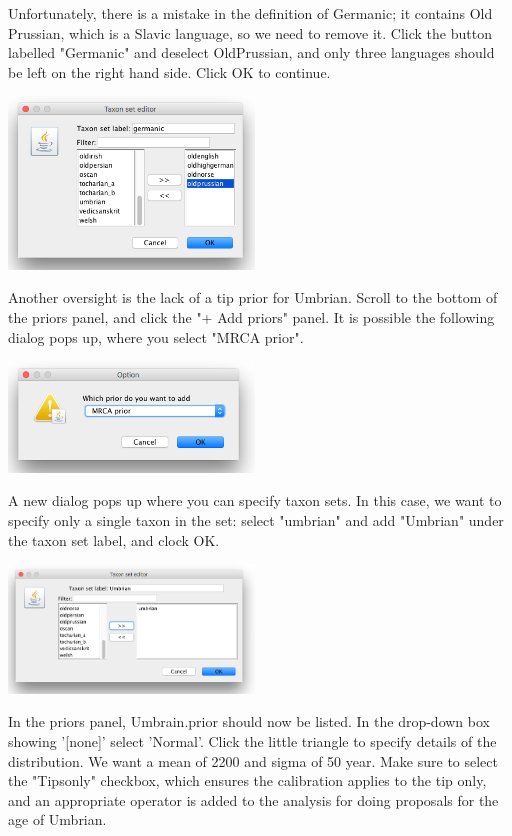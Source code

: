\documentclass{article}
\begin{document}
Unfortunately, there is a mistake in the definition of Germanic; it contains Old Prussian, which is a Slavic language, so we need to remove it. Click the button labelled "Germanic" and deselect  OldPrussian, and only three languages should be left on the right hand side. Click OK to continue.

\begin{center}
\includegraphics[width=0.49\textwidth]{germanic}
\end{center}

Another oversight is the lack of a tip prior for Umbrian. Scroll to the bottom of the priors panel, and click the "+ Add priors" panel. It is possible the following dialog pops up, where you select "MRCA prior".

\begin{center}
\includegraphics[width=0.49\textwidth]{MRCAPrior}
\end{center}
A new dialog pops up where you can specify taxon sets. In this case, we want to specify only a single taxon  in the set: select "umbrian" and add "Umbrian" under the taxon set label, and clock OK.
\begin{center}
\includegraphics[width=0.49\textwidth]{umbrian}
\end{center}

In the priors panel, Umbrain.prior should now be listed. In the drop-down box showing '[none]' select 'Normal'.
Click the little triangle to specify details of the distribution. We want a mean of 2200 and sigma of 50 year.
Make sure to select the "Tipsonly" checkbox, which ensures the calibration applies to the tip only, and an appropriate operator is added to the analysis for doing proposals for the age of Umbrian.
\end{document}
